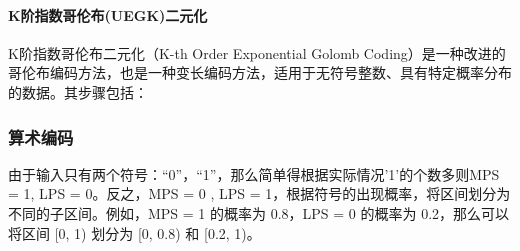 \documentclass{/Users/hi/Study/template/code}
\begin{document}
\paragraph{K阶指数哥伦布(UEGK)二元化}
K阶指数哥伦布二元化（K-th Order Exponential Golomb Coding）是一种改进的哥伦布编码方法，也是一种变长编码方法，适用于无符号整数、具有特定概率分布的数据。其步骤包括：

\subsubsection{算术编码}
由于输入只有两个符号：“0”，“1”，那么简单得根据实际情况'1'的个数多则MPS = 1, LPS = 0。反之，MPS = 0 , LPS = 1，根据符号的出现概率，将区间划分为不同的子区间。例如，MPS = 1 的概率为 0.8，LPS = 0 的概率为 0.2，那么可以将区间 [0, 1) 划分为 [0, 0.8) 和 [0.2, 1)。
\end{document}
